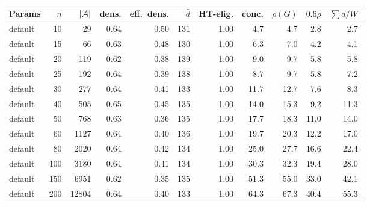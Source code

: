 \begin{tabular}{lrrrrrrrrrr}
\toprule
Params & $n$ & $|\mathcal{A}|$ & dens. & eff.\ dens. & $\bar d$ & HT-elig. & conc. & $\rho(G)$ & $0.6\rho$ & $\sum d/W$ \\
\midrule
default & 10 & 29 & 0.64 & 0.50 & 131 & 1.00 & 4.7 & 4.7 & 2.8 & 2.7 \\
default & 15 & 66 & 0.63 & 0.48 & 130 & 1.00 & 6.3 & 7.0 & 4.2 & 4.1 \\
default & 20 & 119 & 0.62 & 0.38 & 139 & 1.00 & 9.0 & 9.7 & 5.8 & 5.8 \\
default & 25 & 192 & 0.64 & 0.39 & 138 & 1.00 & 8.7 & 9.7 & 5.8 & 7.2 \\
default & 30 & 277 & 0.64 & 0.41 & 133 & 1.00 & 11.7 & 12.7 & 7.6 & 8.3 \\
default & 40 & 505 & 0.65 & 0.45 & 135 & 1.00 & 14.0 & 15.3 & 9.2 & 11.3 \\
default & 50 & 768 & 0.63 & 0.36 & 135 & 1.00 & 17.7 & 18.3 & 11.0 & 14.0 \\
default & 60 & 1127 & 0.64 & 0.40 & 136 & 1.00 & 19.7 & 20.3 & 12.2 & 17.0 \\
default & 80 & 2020 & 0.64 & 0.42 & 134 & 1.00 & 25.0 & 27.7 & 16.6 & 22.4 \\
default & 100 & 3180 & 0.64 & 0.41 & 134 & 1.00 & 30.3 & 32.3 & 19.4 & 28.0 \\
default & 150 & 6951 & 0.62 & 0.35 & 135 & 1.00 & 51.3 & 55.0 & 33.0 & 42.1 \\
default & 200 & 12804 & 0.64 & 0.40 & 133 & 1.00 & 64.3 & 67.3 & 40.4 & 55.3 \\
\bottomrule
\end{tabular}
